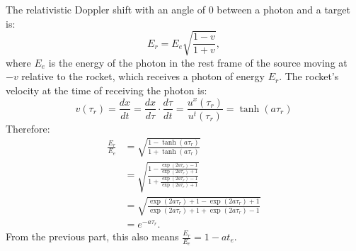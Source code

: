 \documentclass[a4paper]{article}
\begin{document}
The relativistic Doppler shift with an angle of $0$ between a photon and a target is:
$$E_r = E_e\sqrt{\frac{1 - v}{{1 + v}}},$$
where $E_e$ is the energy of the photon in the rest frame of the source moving at $-v$ relative to the rocket, which receives a photon of energy $E_r$.
The rocket's velocity at the time of receiving the photon is:
$$v(\tau_r) = \frac{dx}{dt} = \frac{dx}{d\tau} \cdot \frac{d\tau}{dt} = \frac{u^x(\tau_r)}{u^t(\tau_r)} = \tanh(a\tau_r)$$
Therefore:
\begin{align*}
	\frac{E_r}{E_e} &= \sqrt{\frac{1 - \tanh(a\tau_r)}{{1 + \tanh(a\tau_r)}}}\\
	&=  \sqrt{\frac{1- \frac{\exp({2a\tau_r}) - 1}{\exp({2a\tau_r}) + 1}}{1 + \frac{\exp({2a\tau_r}) - 1}{\exp({2a\tau_r}) + 1}}}\\
	&=  \sqrt{\frac{\exp({2a\tau_r}) + 1 - \exp({2a\tau_r}) + 1}{\exp({2a\tau_r}) + 1 + \exp({2a\tau_r}) - 1}}\\
	&=  e^{-a\tau_r}.
\end{align*}
From the previous part, this also means $ \frac{E_r}{E_e} = 1 - a t_e$.
\end{document}
